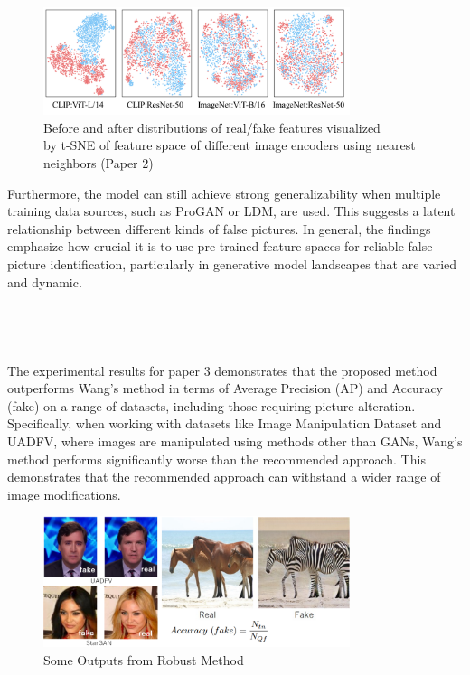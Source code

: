 \documentclass[a4paper,14pt]{report}
\begin{document}
\begin{figure}[H]
    \centering
    \includegraphics[width=0.8\textwidth]{Images/result_paper2.png}
    \caption{Before and after distributions of real/fake features visualized\\ by t-SNE of feature space of different image encoders using nearest neighbors (Paper 2)}
    \label{fig:data_transformation}
\end{figure}
Furthermore, the model can still achieve strong generalizability when multiple training data sources, such as ProGAN or LDM, are used. This suggests a latent relationship between different kinds of false pictures. In general, the findings emphasize how crucial it is to use pre-trained feature spaces for reliable false picture identification, particularly in generative model landscapes that are varied and dynamic.\\
\\
\\
\\
\\
The experimental results for paper 3 demonstrates that the proposed method outperforms Wang's method in terms of Average Precision (AP) and Accuracy (fake) on a range of datasets, including those requiring picture alteration. Specifically, when working with datasets like Image Manipulation Dataset and UADFV, where images are manipulated using methods other than GANs, Wang's method performs significantly worse than the recommended approach. This demonstrates that the recommended approach can withstand a wider range of image modifications.
\begin{figure}[H]
    \centering
    \includegraphics[width=0.8\textwidth]{Images/result_paper3.png}
    \caption{Some Outputs from Robust Method}
    \label{fig:data_transformation}
\end{figure}
\end{document}
